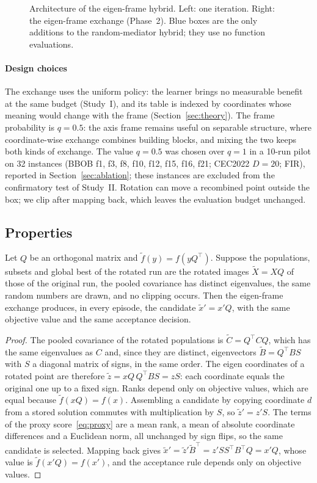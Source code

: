 \begin{figure}[!htbp]
\centering

\caption{Architecture of the eigen-frame hybrid. Left: one iteration. Right: the eigen-frame exchange (Phase~2). Blue boxes
are the only additions to the random-mediator hybrid; they use no function evaluations.}
\label{fig:architecture}
\end{figure}

\paragraph{Design choices} The exchange uses the uniform policy: the learner brings no measurable benefit at the same budget
(Study~I), and its table is indexed by coordinates whose meaning would change with the frame (Section~\ref{sec:theory}). The
frame probability is $q=0.5$: the axis frame remains useful on separable structure, where coordinate-wise exchange combines
building blocks, and mixing the two keeps both kinds of exchange. The value $q=0.5$ was chosen over $q=1$ in a 10-run pilot
on 32 instances (BBOB f1, f3, f8, f10, f12, f15, f16, f21; CEC2022 $D=20$; FIR), reported in Section~\ref{sec:ablation};
these instances are excluded from the confirmatory test of Study~II. Rotation can move a recombined point outside the box;
we clip after mapping back, which leaves the evaluation budget unchanged.

\subsection{Properties}
\begin{proposition}
\label{prop:invariance}
Let $Q$ be an orthogonal matrix and $\tilde f(y)=f(yQ^\top)$. Suppose the populations, subsets and global best of the rotated
run are the rotated images $\tilde X=XQ$ of those of the original run, the pooled covariance has distinct eigenvalues, the
same random numbers are drawn, and no clipping occurs. Then the eigen-frame exchange produces, in every episode, the
candidate $\tilde x'=x'Q$, with the same objective value and the same acceptance decision.
\end{proposition}
\begin{proof}
The pooled covariance of the rotated populations is $\tilde C=Q^\top CQ$, which has the same eigenvalues as $C$ and, since
they are distinct, eigenvectors $\tilde B=Q^\top BS$ with $S$ a diagonal matrix of signs, in the same order. The eigen
coordinates of a rotated point are therefore $\tilde z=xQ\,Q^\top BS=zS$: each coordinate equals the original one up to a
fixed sign. Ranks depend only on objective values, which are equal because $\tilde f(xQ)=f(x)$. Assembling a candidate by
copying coordinate $d$ from a stored solution commutes with multiplication by $S$, so $\tilde z'=z'S$. The terms of the proxy
score~\eqref{eq:proxy} are a mean rank, a mean of absolute coordinate differences and a Euclidean norm, all unchanged by
sign flips, so the same candidate is selected. Mapping back gives $\tilde x'=\tilde z'\tilde B^\top=z'SS^\top B^\top Q=x'Q$,
whose value is $\tilde f(x'Q)=f(x')$, and the acceptance rule depends only on objective values.
\end{proof}

